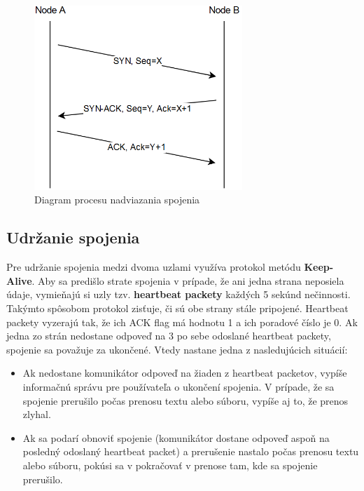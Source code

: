 \documentclass[a4paper,12pt]{article}
\begin{document}
	\begin{figure}[h]
		\centering
		\includegraphics[width=0.70\textwidth]{handshake_diagram.png}
		\caption{Diagram procesu nadviazania spojenia}
		\label{fig:handshake_diagram}
	\end{figure}
	

    \subsection{Udržanie spojenia}\label{keepalive}
	Pre udržanie spojenia medzi dvoma uzlami využíva protokol metódu \textbf{Keep-Alive}. Aby sa predišlo strate spojenia v prípade, že ani jedna strana neposiela údaje, vymieňajú si uzly tzv. \textbf{heartbeat packety} každých 5 sekúnd nečinnosti. Takýmto spôsobom protokol zisťuje, či sú obe strany stále pripojené. Heartbeat packety vyzerajú tak, že ich ACK flag má hodnotu 1 a ich poradové číslo je 0. Ak jedna zo strán nedostane odpoveď na 3 po sebe odoslané heartbeat packety, spojenie sa považuje za ukončené. Vtedy nastane jedna z nasledujúcich situácií:

	\begin{itemize}
	\item Ak nedostane komunikátor odpoveď na žiaden z heartbeat packetov, vypíše informačnú správu pre používateľa o ukončení spojenia. V prípade, že sa spojenie prerušilo počas prenosu textu alebo súboru, vypíše aj to, že prenos zlyhal.
	\item Ak sa podarí obnoviť spojenie (komunikátor dostane odpoveď aspoň na posledný odoslaný heartbeat packet) a prerušenie nastalo počas prenosu textu alebo súboru, pokúsi sa v pokračovať v prenose tam, kde sa spojenie prerušilo.
   	\end{itemize}
\end{document}
